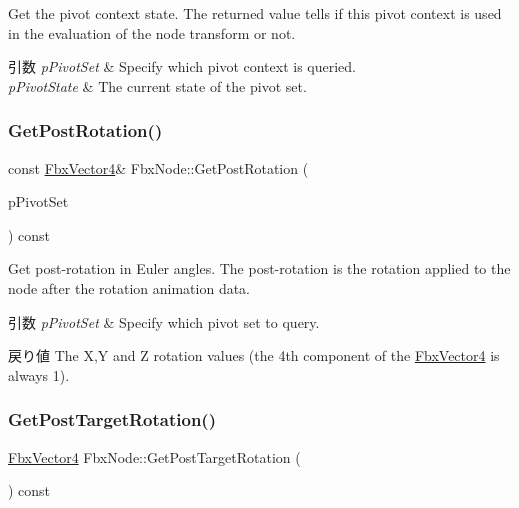 Get the pivot context state. The returned value tells if this pivot context is used in the evaluation of the node transform or not. 
\begin{DoxyParams}{引数}
{\em p\+Pivot\+Set} & Specify which pivot context is queried. \\
\hline
{\em p\+Pivot\+State} & The current state of the pivot set. \\
\hline
\end{DoxyParams}
\mbox{\label{class_fbx_node_a7a60a83de24636c96067cff6a79903f5}} 
\subsubsection{\texorpdfstring{Get\+Post\+Rotation()}{GetPostRotation()}}
{\footnotesize\ttfamily const \hyperlink{class_fbx_vector4}{Fbx\+Vector4}\& Fbx\+Node\+::\+Get\+Post\+Rotation (\begin{DoxyParamCaption}\item[{\hyperlink{class_fbx_node_ae62b7311ac4727654cdf1ebd5cbf7343}{E\+Pivot\+Set}}]{p\+Pivot\+Set }\end{DoxyParamCaption}) const}

Get post-\/rotation in Euler angles. The post-\/rotation is the rotation applied to the node after the rotation animation data. 
\begin{DoxyParams}{引数}
{\em p\+Pivot\+Set} & Specify which pivot set to query. \\
\hline
\end{DoxyParams}
\begin{DoxyReturn}{戻り値}
The X,Y and Z rotation values (the 4th component of the \hyperlink{class_fbx_vector4}{Fbx\+Vector4} is always 1). 
\end{DoxyReturn}
\mbox{\label{class_fbx_node_ab484186dcdd304a6649b1d4e3fbfc633}} 
\subsubsection{\texorpdfstring{Get\+Post\+Target\+Rotation()}{GetPostTargetRotation()}}
{\footnotesize\ttfamily \hyperlink{class_fbx_vector4}{Fbx\+Vector4} Fbx\+Node\+::\+Get\+Post\+Target\+Rotation (\begin{DoxyParamCaption}{ }\end{DoxyParamCaption}) const}

